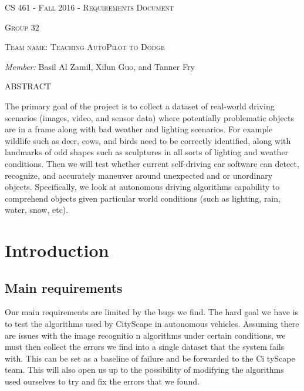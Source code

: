 \documentclass[letterpaper,10pt]{article}
\begin{document}
\begin{titlepage}
\begin{center}
    \textsc{\LARGE CS 461 - Fall 2016 - Requirements Document}

    \textsc{Group 32}
    
    \textsc{Team name: Teaching AutoPilot to Dodge}
    
    \emph{Member:}
    Basil Al Zamil,
    Xilun Guo, and
    Tanner Fry
    \setlength{\parskip}{20pt}

\textsc{\large ABSTRACT}
\end{center}

The primary goal of the project is to collect a dataset of real-world driving scenarios (images, video, and sensor data) where potentially problematic objects are in a frame along with bad weather and lighting scenarios. For example wildlife such as deer, cows, and birds need to be correctly identified, along with landmarks of odd shapes such as sculptures in all sorts of lighting and weather conditions. Then we will test whether current self-driving car software can detect, recognize, and accurately maneuver around unexpected and or unordinary objects. Specifically, we look at autonomous driving algorithms capability to comprehend objects given particular world conditions (such as lighting, rain, water, snow, etc). 
\end{titlepage}

\tableofcontents

\newpage

\section{Introduction}
    \subsection{Main requirements}

    Our main requirements are limited by the bugs we find. The hard goal we have is to test the algorithms used by CityScape in autonomous vehicles. Assuming there are issues with the image recognitio    n algorithms under certain conditions, we must then collect the errors we find into a single dataset that the system fails with. This can be set as a baseline of failure and be forwarded to the Ci    tyScape team. This will also open us up to the possibility of modifying the algorithms used ourselves to try and fix the errors that we found. 
\end{document}
